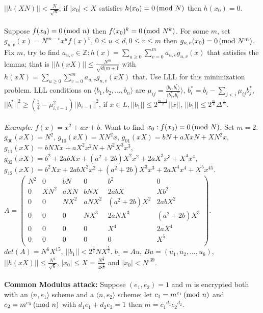 $||h(XN)|| < {\frac N {\sqrt n}}$; if $|x_0 |<X$ satisfies $h(x_0 ) = 0 \thinspace \textnormal{(mod } N \textnormal{)}$ then
$h(x_0)=0$.
\\
\\
Suppose $f(x_0)=0 \thinspace \textnormal{(mod } n \textnormal{)}$ then $f(x_0)^k= 0 \thinspace \textnormal{(mod } N^k \textnormal{)}$.  For some $m$,
set $g_{u,v}(x)= N^{m-v} x^u f(x)^v$, $0 \le u < d, 0 \le v \le m$
then $g_{u,v} (x_0)= 0 \thinspace \textnormal{(mod } N^m \textnormal{)}$.  
Fix $m$, try to find
$a_{u,v} \in {\mathbb Z}: 
h(x)= \sum_{u \ge 0} \sum_{v=0}^m a_{u, v} g_{u,v}(x)$ that
satisfies the lemma; that is $||h(xX)|| \le {\frac {N^m} {\sqrt {d(m+1}}}$
with $h(xX)= \sum_{u \ge 0} \sum_{v=0}^m a_{u, v} g_{u,v}(xX)$ that.  Use LLL for
this minimization problem.
LLL conditions on $\langle b_1 , b_2 , \ldots , b_n \rangle$ are 
$\mu_{ij} = {\frac {\langle b_i, b_i^* \rangle} {\langle b_i^*, b_i^*} \rangle}$,
$b_i^*= b_i - \sum_{j<i} \mu_{ij} b_j^*$,
$||b_i^*||^2 \ge ({\frac 3 4} - \mu_{i,i-1}^2) ||b_{i-1}||^2$, if 
$x \in L, ||b_1|| \le 2^{\frac {m-1} 2} ||x||$, $||b_1|| \le 2^{\frac m 4} \Delta^{\frac 1 m}$.
\\
\\
\emph{Example:} $f(x)= x^2 + ax + b$.  Want to find $x_0: f(x_0)=0 \thinspace \textnormal{(mod } N \textnormal{)}$.  Set $m=2$.
$g_{00}(xX)= N^2$,
$g_{10}(xX)= XN^2 x$,
$g_{01}(xX)= bN + aXxN+ XN^2 x$,
$g_{11}(xX)= bNXx + aX^2x^2N+ N^2 X^3x^3$,
$g_{02}(xX)= b^2 + 2ab Xx+ (a^2 + 2b) X^2 x^2 + 2a X^3 x^3 + X^4 x^4$,
$g_{12}(xX)= b^2Xx + 2ab X^2x^2+ (a^2 + 2b) X^3 x^3 + 2a X^4 x^4 + X^5 x^45$.
$A=
\left(
\begin {array} {cccccc}
N^2 & 0 & bN & 0 & b^2 & 0 \\
0 & XN^2 & aXN & bNX & 2abX & Xb^2 \\
0 & 0 & NX^2 & aNX^2 & (a^2+2b)X^2 & 2ab X^2 \\
0 & 0 & 0 & NX^3 & 2aNX^3 & (a^2+2b)X^3\\
0 & 0 & 0 & 0 & X^4 & 2aX^4\\
0 & 0 & 0 & 0 & 0 & X^5\\
\end {array}
\right)$.
$det(A) = N^6 X^{15}$, $||b_1|| < 2^{\frac 3 2} N X^{\frac 5 2}$.  
$b_1 = Au$, $Bu= (u_1 , u_2, \ldots , u_6)$, $||h(xX)|| \le {\frac {N^2} {\sqrt 6}}$,
$|x_0| \le X = {\frac {N^{\frac 2 5}} {48^{\frac 1 8}}}$ and $|x_0| < N^{.39}$.
\\
\\
{\bf Common Modulus attack:} Suppose $(e_1, e_2)=1$ and $m$ is encrypted both with an
$\langle n,e_1 \rangle$ scheme and a $\langle n, e_2 \rangle$ scheme; let 
$c_1= m^{e_1} \thinspace \textnormal{(mod } n \textnormal{)}$ and
$c_2= m^{e_2} \thinspace \textnormal{(mod } n \textnormal{)}$ with $d_1 e_1 + d_2 e_2=1$ then $m= {c_1}^{d_1} {c_2}^{d_2}$.
